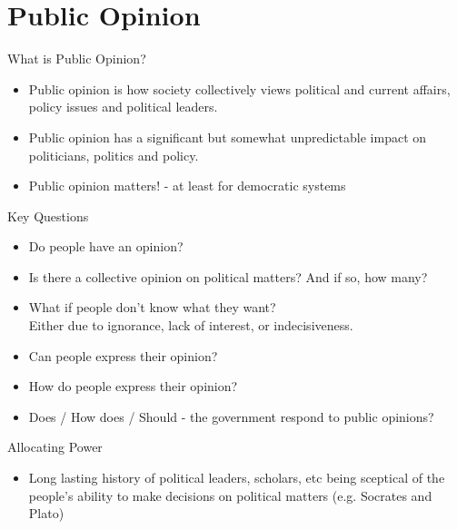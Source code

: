 \documentclass{beamer}
\begin{document}
\section{Public Opinion}

\begin{frame}{What is Public Opinion?}
\begin{itemize}
    \item<1->  Public opinion is how society collectively views political and current affairs, policy issues and political leaders. 
    \item<2-> Public opinion has a significant but somewhat unpredictable impact on politicians, politics and policy.
    \item<3-> Public opinion matters! - at least for democratic systems
\end{itemize}
\end{frame}


\begin{frame}{Key Questions}
\begin{itemize}
    \item Do people have an opinion?
    \item Is there a collective opinion on political matters? And if so, how many?
    \item What if people don't know what they want?\\ Either due to ignorance, lack of interest, or indecisiveness.
    \item Can people express their opinion?
    \item How do people express their opinion?
    \item Does / How does / Should - the government respond to public opinions?
\end{itemize}
\end{frame}


\begin{frame}{Allocating Power}
\begin{itemize}
    \item Long lasting history of political leaders, scholars, etc being sceptical of the people's ability to make decisions on political matters (e.g. Socrates and Plato)
\end{itemize}
\end{frame}
\end{document}
